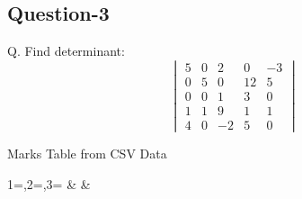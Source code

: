 \documentclass{article}
\begin{document}
\subsection{Question-3}
Q. Find determinant:
\[
\begin{vmatrix}5 & 0 & 2 & 0 & -3 \\
	0 & 5 & 0 & 12 & 5 \\
	0 & 0 & 1 & 3 & 0 \\
	1 & 1 & 9 & 1 & 1 \\
	4 & 0 & -2 & 5 & 0 
\end{vmatrix}
\]


\begin{table}[htbp]
    \centering
    \caption{Marks Table from CSV Data}
    {1=\name,2=\age,3=\occupation}
    {\name & \age & \occupation}
\end{table}




%
\end{document}

